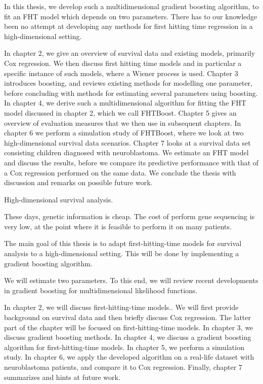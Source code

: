 In this thesis, we develop such a multidimensional gradient boosting algorithm, to fit an FHT model which depends on two parameters.
There has to our knowledge been no attempt at developing any methods for first hitting time regression in a high-dimensional setting.

In chapter 2, we give an overview of survival data and existing models, primarily Cox regression.
We then discuss first hitting time models and in particular a specific instance of such models, where a Wiener process is used.
Chapter 3 introduces boosting, and reviews existing methods for modelling one parameter, before concluding with methods for estimating several parameters using boosting.
In chapter 4, we derive such a multidimensional algorithm for fitting the FHT model discussed in chapter 2, which we call FHTBoost.
Chapter 5 gives an overview of evaluation measures that we then use in subsequent chapters.
In chapter 6 we perform a simulation study of FHTBoost, where we look at two high-dimensional survival data scenarios.
Chapter 7 looks at a survival data set consisting children diagnosed with neuroblastoma.
We estimate an FHT model and discuss the results, before we compare its predictive performance with that of a Cox regression performed on the same data.
We conclude the thesis with discussion and remarks on possible future work.



High-dimensional survival analysis.

These days, genetic information is cheap.
The cost of perform gene sequencing is very low, at the point where it is feasible to perform it on many patients.


The main goal of this thesis is to adapt first-hitting-time models for survival analysis to a high-dimensional setting.
This will be done by implementing a gradient boosting algorithm.

We will estimate two parameters.
To this end, we will review recent developments in gradient boosting for multidimensional likelihood functions.

In chapter 2, we will discuss first-hitting-time models..
We will first provide background on survival data and then briefly discuss Cox regression.
The latter part of the chapter will be focused on first-hitting-time models.
In chapter 3, we discuss gradient boosting methods.
In chapter 4, we discuss a gradient boosting algorithm for first-hitting-time models.
In chapter 5, we perform a simulation study.
In chapter 6, we apply the developed algorithm on a real-life dataset with neuroblastoma patients, and compare it to Cox regression.
Finally, chapter 7 summarizes and hints at future work.